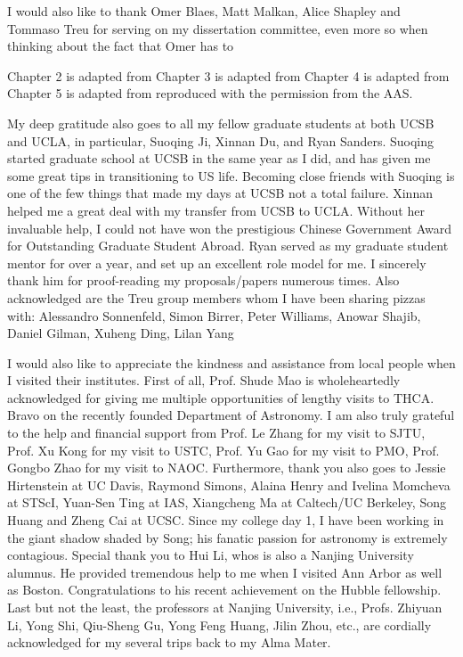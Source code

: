 I would also like to thank Omer Blaes, Matt Malkan, Alice Shapley and Tommaso Treu for serving on my dissertation
committee,
even more so when thinking about the fact that Omer has to 

Chapter 2 is adapted from
Chapter 3 is adapted from
Chapter 4 is adapted from
Chapter 5 is adapted from
reproduced with the permission from the AAS.


My deep gratitude also goes to all my fellow graduate students at both UCSB and UCLA, in particular, Suoqing Ji,
Xinnan Du, and Ryan Sanders.
Suoqing started graduate school at UCSB in the same year as I did, and has given me some great tips in
transitioning to US life.
Becoming close friends with Suoqing is one of the few things that made my days at UCSB not a total failure.
Xinnan helped me a great deal with my transfer from UCSB to UCLA.
Without her invaluable help, I could not have won the prestigious Chinese Government Award for Outstanding
Graduate Student Abroad.
Ryan served as my graduate student mentor for over a year, and set up an excellent role model for me.
I sincerely thank him for proof-reading my proposals/papers numerous times.
Also acknowledged are the Treu group members whom I have been sharing pizzas with:
Alessandro Sonnenfeld, Simon Birrer, Peter Williams, Anowar Shajib, Daniel Gilman, Xuheng Ding, Lilan Yang

I would also like to appreciate the kindness and assistance from local people when I visited their institutes.
First of all, Prof. Shude Mao is wholeheartedly acknowledged for giving me multiple opportunities of lengthy visits to THCA.
Bravo on the recently founded Department of Astronomy.
I am also truly grateful to the help and financial support from Prof. Le Zhang for my visit to SJTU, 
Prof. Xu Kong for my visit to USTC, Prof. Yu Gao for my visit to PMO, Prof. Gongbo Zhao for my visit to NAOC.
Furthermore, thank you also goes to Jessie Hirtenstein at UC Davis, Raymond Simons, Alaina Henry and Ivelina
Momcheva at STScI, Yuan-Sen Ting at IAS, 
Xiangcheng Ma at Caltech/UC Berkeley, 
Song Huang and Zheng Cai at UCSC.
Since my college day 1, I have been working in the giant shadow shaded by Song; 
his fanatic passion for astronomy is extremely contagious.
Special thank you to Hui Li, whos is also a Nanjing University alumnus.
He provided tremendous help to me when I visited Ann Arbor as well as Boston.
Congratulations to his recent achievement on the Hubble fellowship.
Last but not the least, the professors at Nanjing University, i.e., Profs. Zhiyuan Li, Yong Shi, Qiu-Sheng Gu,
Yong Feng Huang, Jilin Zhou, etc., are cordially acknowledged for my several trips back to my Alma Mater.




%
%
%
%


